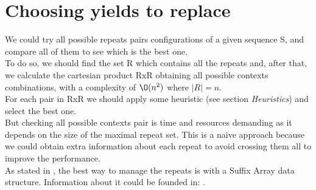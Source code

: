 \section{Choosing yields to replace}


We could try all possible repeats pairs configurations of a given sequence S, and compare all of them
to see which is the best one. \\

To do so, we should find the set R which contains all the repeats and, after that, we calculate the cartesian product RxR obtaining all possible contexts combinations, with a complexity of $\O(n^2)$ where $|R| = n$.  \\  

For each pair in RxR we should apply some heuristic (see section \emph{Heuristics}) and select the best one. \\

But checking all possible contexts pair is time and resources demanding as it depends on the size of the 
maximal repeat set. This is a naive approach because we could obtain extra information about each repeat to avoid crossing them all to improve the performance.\\

As stated in \cite{GThesis}, the best way to manage the repeats is with a Suffix Array
data structure. Information about it could be founded in: \cite[p. 40]{GThesis}.





